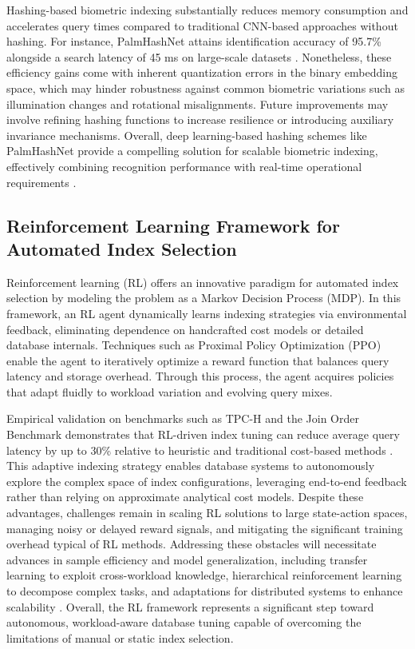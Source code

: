 \documentclass[sigconf]{acmart}
\begin{document}
Hashing-based biometric indexing substantially reduces memory consumption and accelerates query times compared to traditional CNN-based approaches without hashing. For instance, PalmHashNet attains identification accuracy of 95.7\% alongside a search latency of 45 ms on large-scale datasets \cite{ref32}. Nonetheless, these efficiency gains come with inherent quantization errors in the binary embedding space, which may hinder robustness against common biometric variations such as illumination changes and rotational misalignments. Future improvements may involve refining hashing functions to increase resilience or introducing auxiliary invariance mechanisms. Overall, deep learning-based hashing schemes like PalmHashNet provide a compelling solution for scalable biometric indexing, effectively combining recognition performance with real-time operational requirements \cite{ref32}.

\subsection{Reinforcement Learning Framework for Automated Index Selection}

Reinforcement learning (RL) offers an innovative paradigm for automated index selection by modeling the problem as a Markov Decision Process (MDP). In this framework, an RL agent dynamically learns indexing strategies via environmental feedback, eliminating dependence on handcrafted cost models or detailed database internals. Techniques such as Proximal Policy Optimization (PPO) enable the agent to iteratively optimize a reward function that balances query latency and storage overhead. Through this process, the agent acquires policies that adapt fluidly to workload variation and evolving query mixes.

Empirical validation on benchmarks such as TPC-H and the Join Order Benchmark demonstrates that RL-driven index tuning can reduce average query latency by up to 30\% relative to heuristic and traditional cost-based methods \cite{ref33}. This adaptive indexing strategy enables database systems to autonomously explore the complex space of index configurations, leveraging end-to-end feedback rather than relying on approximate analytical cost models. Despite these advantages, challenges remain in scaling RL solutions to large state-action spaces, managing noisy or delayed reward signals, and mitigating the significant training overhead typical of RL methods. Addressing these obstacles will necessitate advances in sample efficiency and model generalization, including transfer learning to exploit cross-workload knowledge, hierarchical reinforcement learning to decompose complex tasks, and adaptations for distributed systems to enhance scalability \cite{ref33}. Overall, the RL framework represents a significant step toward autonomous, workload-aware database tuning capable of overcoming the limitations of manual or static index selection.
\end{document}
